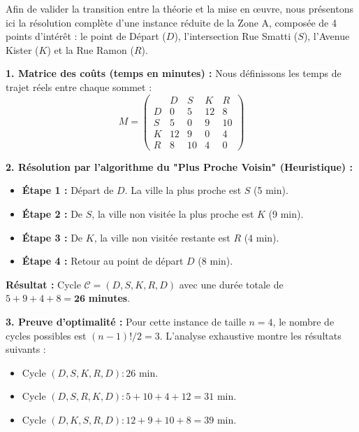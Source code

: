 \noindent Afin de valider la transition entre la théorie et la mise en œuvre, nous présentons ici la résolution complète d'une instance réduite de la Zone A, composée de 4 points d'intérêt : le point de Départ ($D$), l'intersection Rue Smatti ($S$), l'Avenue Kister ($K$) et la Rue Ramon ($R$).

\vspace{0.3cm}

\noindent \textbf{1. Matrice des coûts (temps en minutes) :}
\noindent Nous définissons les temps de trajet réels entre chaque sommet :
\[
M = \begin{pmatrix} 
 & D & S & K & R \\
D & 0 & 5 & 12 & 8 \\
S & 5 & 0 & 9 & 10 \\
K & 12 & 9 & 0 & 4 \\
R & 8 & 10 & 4 & 0 
\end{pmatrix}
\]

\noindent \textbf{2. Résolution par l'algorithme du "Plus Proche Voisin" (Heuristique) :}
\begin{itemize}
    \item \textbf{Étape 1 :} Départ de $D$. La ville la plus proche est $S$ (5 min).
    \item \textbf{Étape 2 :} De $S$, la ville non visitée la plus proche est $K$ (9 min).
    \item \textbf{Étape 3 :} De $K$, la ville non visitée restante est $R$ (4 min).
    \item \textbf{Étape 4 :} Retour au point de départ $D$ (8 min).
\end{itemize}
\noindent \textbf{Résultat :} Cycle $\mathcal{C} = (D, S, K, R, D)$ avec une durée totale de $5 + 9 + 4 + 8 = \mathbf{26}$ \textbf{minutes}.

\vspace{0.3cm}

\noindent \textbf{3. Preuve d'optimalité :}
\noindent Pour cette instance de taille $n=4$, le nombre de cycles possibles est $(n-1)! / 2 = 3$. L'analyse exhaustive montre les résultats suivants :
\begin{itemize}
    \item Cycle $(D, S, K, R, D) : 26$ min.
    \item Cycle $(D, S, R, K, D) : 5 + 10 + 4 + 12 = 31$ min.
    \item Cycle $(D, K, S, R, D) : 12 + 9 + 10 + 8 = 39$ min.
\end{itemize}

\vspace{0.5cm}


